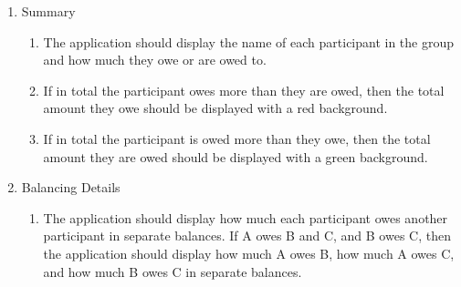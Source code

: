 \documentclass[conference]{IEEEtran}
\begin{document}
\begin{enumerate}
\begin{enumerate}
\begin{enumerate}
                    \end{enumerate}
                \item Summary
                    \begin{enumerate}
                        \item The application should display the name of each participant in the group and how much they owe or are owed to.
                        \item If in total the participant owes more than they are owed, then the total amount they owe should be displayed with a red background.
                        \item If in total the participant is owed more than they owe, then the total amount they are owed should be displayed with a green background.
                    \end{enumerate}
                \item Balancing Details
                    \begin{enumerate}
                        \item The application should display how much each participant owes another participant in separate balances. If A owes B and C, and B owes C, then the application should display how much A owes B, how much A owes C, and how much B owes C in separate balances.
                    \end{enumerate}
            \end{enumerate}
    \end{enumerate}
\end{document}
